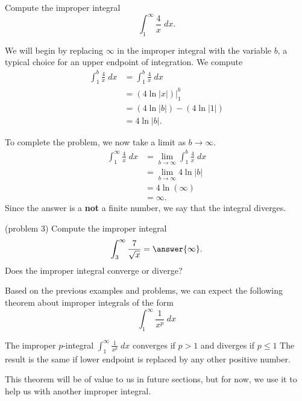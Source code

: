 \documentclass[handout]{ximera}
\begin{document}
\begin{example}[example 3]
Compute the improper integral
\[
\int_1^\infty \frac{4}{x} \; dx.
\]

We will begin by replacing $\infty$ in the improper integral with the variable $b$, a typical choice for an upper endpoint of integration.
We compute
\begin{align*}
\int_1^b \frac{4}{x} \; dx &= \int_1^b \frac{4}{x} \; dx\\
                           &= \left(4\ln|x| \right) \bigg|_1^b\\
                       &= \left(4\ln|b| \right) - \left(4\ln|1| \right)\\
                       &=4\ln|b|.
\end{align*}
                       
To complete the problem, we now take a limit as $b \to \infty$.
\begin{align*}
\int_1^\infty \frac{4}{x} \; dx &= \lim_{b \to \infty}\int_1^b \frac{4}{x} \; dx\\
                       &=\lim_{b \to \infty} 4\ln|b|\\
                       &= 4\ln(\infty)\\
                       &= \infty.
\end{align*}
Since the answer is a \textbf{not} a finite number, we say that the integral diverges.

\end{example}


\begin{problem}(problem 3)
Compute the improper integral
\[
\int_3^\infty \frac{7}{\sqrt x} = \answer{\infty}.
\]
Does the improper integral converge or diverge?
\begin{multipleChoice}
\end{multipleChoice}
\end{problem}

Based on the previous examples and problems, we can expect the following theorem about improper integrals of the form
\[
\int_1^\infty \frac{1}{x^p} \; dx
\]

\begin{theorem}[$p$-integrals]
The improper $p$-integral $\int_1^\infty \frac{1}{x^p} \; dx$
 converges if $p>1$ and diverges if $p \leq 1$
The result is the same if lower endpoint is replaced by any other positive number.
\end{theorem}
This theorem will be of value to us in future sections, but for now, we use it to help us with another improper integral.
\end{document}
